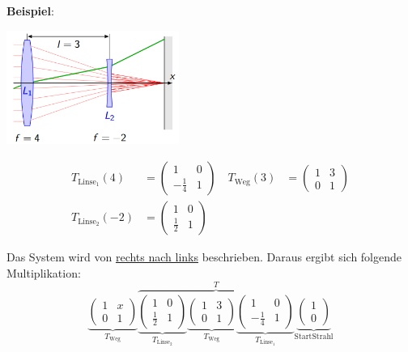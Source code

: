 \noindent \textbf{Beispiel}:\\
\begin{center}
	\includegraphics[height=10em]{./Images/optik_beispiel.png}
\end{center}

\begin{align*}
	T_{\text{Linse}_1}(4) &= \begin{pmatrix}
		1 & 0 \\ -\frac{1}{4} & 1
	\end{pmatrix} \quad 
	T_{\text{Weg}}(3) &= \begin{pmatrix}
		1 & 3 \\ 0 & 1
	\end{pmatrix} \\
	T_{\text{Linse}_2}(-2) &= \begin{pmatrix}
		1 & 0 \\ \frac{1}{2} & 1
	\end{pmatrix}
\end{align*}

\noindent Das System wird von \underline{rechts nach links} beschrieben. Daraus ergibt sich folgende Multiplikation:
\[
\underbrace{
	\begin{pmatrix}
		1 & x \\ 0 & 1
	\end{pmatrix}
}_{T_{\text{Weg}}}
\overbrace{
	\underbrace{
		\begin{pmatrix}
			1 & 0 \\ \frac{1}{2} & 1
		\end{pmatrix}
	}_{T_{\text{Linse}_2}}
	\underbrace{
		\begin{pmatrix}
			1 & 3 \\ 0 & 1
		\end{pmatrix}
	}_{T_{\text{Weg}}}
	\underbrace{
		\begin{pmatrix}
			1 & 0 \\ -\frac{1}{4} & 1
		\end{pmatrix}
	}_{T_{\text{Linse}_1}}
}^{T}
\underbrace{
	\begin{pmatrix}
		1 \\ 0
	\end{pmatrix}
}_{\text{StartStrahl}}
\]

